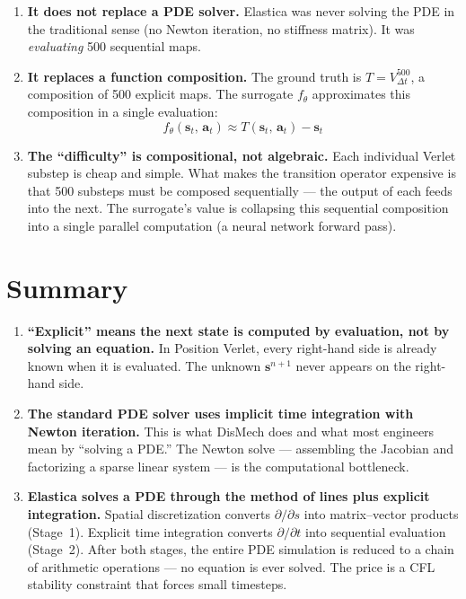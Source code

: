 \documentclass[11pt]{article}
\newcommand{\vect}[1]{\mathbf{#1}}
\begin{document}
\begin{enumerate}
  \item \textbf{It does not replace a PDE solver.}
    Elastica was never solving the PDE in the traditional sense (no Newton iteration, no stiffness matrix).
    It was \emph{evaluating} 500 sequential maps.

  \item \textbf{It replaces a function composition.}
    The ground truth is $T = V_{\Delta t}^{500}$, a composition of 500 explicit maps.
    The surrogate $f_\theta$ approximates this composition in a single evaluation:
    \begin{equation}
      f_\theta(\vect{s}_t,\, \vect{a}_t) \approx T(\vect{s}_t,\, \vect{a}_t) - \vect{s}_t
      \label{eq:surrogate}
    \end{equation}

  \item \textbf{The ``difficulty'' is compositional, not algebraic.}
    Each individual Verlet substep is cheap and simple.
    What makes the transition operator expensive is that 500 substeps must be composed sequentially --- the output of each feeds into the next.
    The surrogate's value is collapsing this sequential composition into a single parallel computation (a neural network forward pass).
\end{enumerate}

\section{Summary}
\label{sec:summary}

\begin{enumerate}
  \item \textbf{``Explicit'' means the next state is computed by evaluation, not by solving an equation.}
    In Position Verlet, every right-hand side is already known when it is evaluated.
    The unknown $\vect{s}^{n+1}$ never appears on the right-hand side.

  \item \textbf{The standard PDE solver uses implicit time integration with Newton iteration.}
    This is what DisMech does and what most engineers mean by ``solving a PDE.''
    The Newton solve --- assembling the Jacobian and factorizing a sparse linear system --- is the computational bottleneck.

  \item \textbf{Elastica solves a PDE through the method of lines plus explicit integration.}
    Spatial discretization converts $\partial/\partial s$ into matrix--vector products (Stage~1).
    Explicit time integration converts $\partial/\partial t$ into sequential evaluation (Stage~2).
    After both stages, the entire PDE simulation is reduced to a chain of arithmetic operations --- no equation is ever solved.
    The price is a CFL stability constraint that forces small timesteps.
\end{enumerate}
\end{document}
